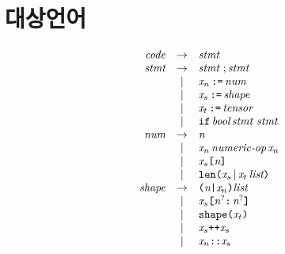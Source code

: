 \documentclass{article}
\begin{document}
\section{대상언어}
\begin{Large}
  \[\begin{array}{lcrclr}
  && \textit{code} & \rightarrow & \textit{stmt} & \\
  && \textit{stmt} & \rightarrow & \textit{stmt} \ ; \textit{stmt} & \\
  &&          & | & \textit{x}_{n} \, \texttt{:=} \, \textit{num} & \\
  &&          & | & \textit{x}_{s}\, \texttt{:=} \, \textit{shape} & \\
  &&          & | & \textit{x}_{t}\, \texttt{:=} \, \textit{tensor} & \\
  &&          & | & \texttt{if} \, \textit{bool} \, \textit{stmt stmt}& \\
  && \textit{num} & \rightarrow & \textit{n} & \\
  &&          & | & \textit{x}_{n} \, \textit{numeric-op} \, \textit{x}_{n} & \\
  &&          & | & \textit{x}_{s}\texttt{[}\textit{n}\texttt{]} & \\
  &&          & | & \texttt{len(} \textit{x}_{s} \, | \, \textit{x}_{t}\,\textit{list} \texttt{)} & \\
  && \textit{shape} & \rightarrow & \texttt{(} \textit{n} \texttt{|} \textit{x}_{n} \texttt{)} \textit{list} & \\
  &&          & | & \textit{x}_{s}\texttt{[}\textit{n}^{?}\texttt{:}\,\textit{n}^{?}\texttt{]} & \\
  &&          & | & \texttt{shape}\texttt{(}\textit{x}_{t}\texttt{)} & \\
  &&          & | & \textit{x}_{s} \texttt{++} \textit{x}_{s} & \\
  &&          & | & \textit{x}_{n} \texttt{::} \textit{x}_{s} & \\
\end{array}\] \\
\end{Large}
\end{document}
